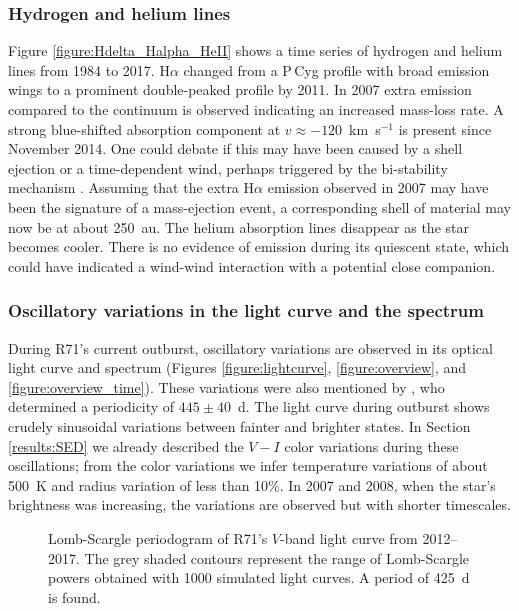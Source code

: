 \documentclass[structabstract]{aa}
\begin{document}
\subsubsection{Hydrogen and helium lines} 
\label{results:hydrogen_helium}


Figure \ref{figure:Hdelta_Halpha_HeII} shows a time series of hydrogen and helium lines from 1984 to 2017.
H$\alpha$ changed from a P\,Cyg profile with broad emission wings  to a prominent double-peaked profile by 2011. 
In 2007 extra emission compared to the continuum is observed indicating an increased mass-loss rate. 
A strong blue-shifted absorption component at $v \approx -120$~km~s$^{-1}$ is present since November 2014. One could debate if this may have been caused by a shell ejection or a time-dependent wind, perhaps triggered by the bi-stability mechanism \citep{2011A&A...531L..10G}. Assuming that the extra H$\alpha$ emission observed in 2007 may have been the signature of a mass-ejection event, a corresponding shell of material may now be at about 250~au.
The helium absorption lines disappear as the star becomes cooler. There is no evidence of  emission during its quiescent state, which could have indicated a wind-wind interaction with a potential close companion.


\subsubsection{Oscillatory variations in the light curve and the spectrum}
\label{results:cycle}


During R71's current outburst, oscillatory variations are observed in its optical light curve and spectrum (Figures \ref{figure:lightcurve}, \ref{figure:overview}, and \ref{figure:overview_time}). These variations were also mentioned by \citealt{2017AJ....154...15W}, who determined a periodicity of $445\pm40$~d.
The light curve during outburst shows crudely sinusoidal variations between fainter and brighter states. In Section \ref{results:SED} we already described the $V-I$ color variations during these oscillations; from the color variations we infer temperature variations of about 500~K and radius variation of less than 10\%. In 2007 and 2008, when the star's brightness was increasing, the variations are observed but with shorter timescales.

 \begin{figure}
\centering
{}
     \caption{Lomb-Scargle periodogram of R71's $V$-band light curve from 2012--2017. The grey shaded contours represent the range of Lomb-Scargle powers obtained with 1000 simulated light curves. A period of 425~d is found.}
     \label{figure:periodogram}
\end{figure}
\end{document}
